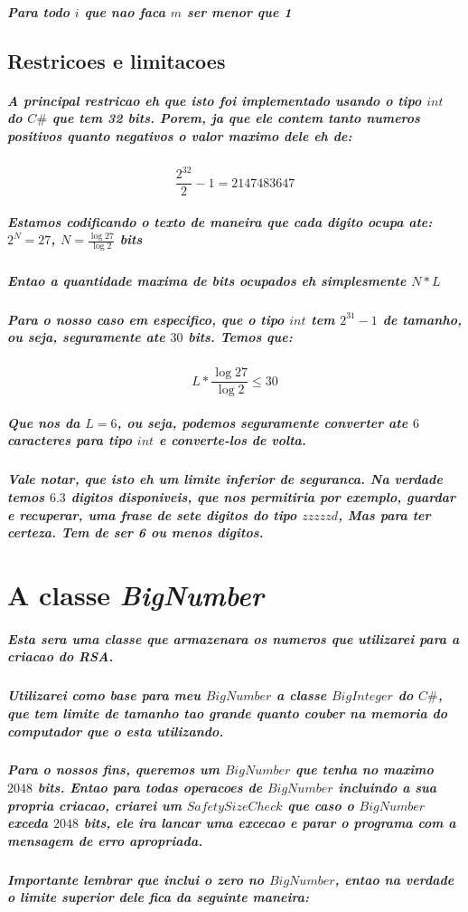 \documentclass[12pt,twoside, a4paper, twocolumn]{article}
\begin{document}
\subparagraph*{Para todo $i$ que nao faca $m$ ser menor que 1}

\subsection{Restricoes e limitacoes}

\subparagraph*{A principal restricao eh que isto foi implementado usando o tipo $int$ do $C\#$ que tem 32 bits. Porem, ja que ele contem tanto numeros positivos quanto negativos o valor maximo dele eh de:}

\begin{equation}
    \frac{2^{32}}{2} - 1 = 2147483647
\end{equation}

\subparagraph*{Estamos codificando o texto de maneira que cada digito ocupa ate: $2^N = 27$, $N = \frac{\log{27}}{\log{2}}$ bits}

\subparagraph*{ Entao a quantidade maxima de bits ocupados eh simplesmente $N*L$}

\subparagraph*{Para o nosso caso em especifico, que o tipo $int$ tem $2^{31} -1$ de tamanho, ou seja, seguramente ate $30$ bits. Temos que:}

\begin{equation}
    L * \frac{\log{27}}{\log{2}} \le 30
\end{equation}

\subparagraph*{Que nos da $L = 6$, ou seja, podemos seguramente converter ate $6$ caracteres para tipo $int$ e converte-los de volta.
}

\subparagraph*{Vale notar, que isto eh um limite inferior de seguranca. Na verdade temos $6.3$ digitos disponiveis, que nos permitiria por exemplo, guardar e recuperar, uma frase de sete digitos do tipo $zzzzzd$, Mas para ter certeza. Tem de ser 6 ou menos digitos.}

\section{A classe \emph{BigNumber}}

\subparagraph*{Esta sera uma classe que armazenara os numeros que utilizarei para a criacao do RSA. }
\subparagraph*{Utilizarei como base para meu $BigNumber$ a classe $BigInteger$ do $C\#$, que tem limite de tamanho tao grande quanto couber na memoria do computador que o esta utilizando.}
\subparagraph*{Para o nossos fins, queremos um $BigNumber$ que tenha no maximo $2048$ bits. Entao para todas operacoes de $BigNumber$ incluindo a sua propria criacao, criarei um $SafetySizeCheck$ que caso o $BigNumber$ exceda $2048$ bits, ele ira lancar uma excecao e parar o programa com a mensagem de erro apropriada.}
\subparagraph*{Importante lembrar que inclui o zero no $BigNumber$, entao na verdade o limite superior dele fica da seguinte maneira:}
\end{document}

